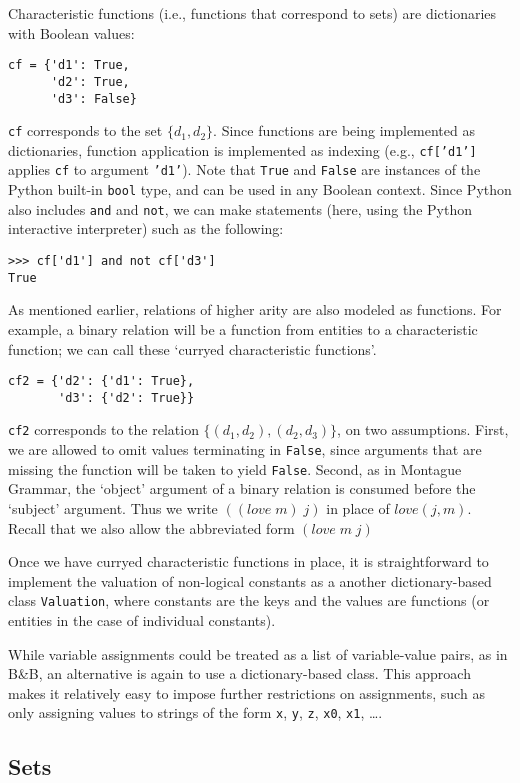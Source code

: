 \documentclass[11pt]{article}
\newcommand{\code}[1]{\texttt{#1}}
\newcommand{\bnb}{B\&B}
\begin{document}
Characteristic functions (i.e.,  functions that correspond to sets)
are dictionaries with Boolean values:
\begin{Verbatim}
cf = {'d1': True, 
      'd2': True, 
      'd3': False}
\end{Verbatim}
\code{cf} corresponds to the set $\{d_1, d_2\}$. Since functions are
being implemented as dictionaries, function application is implemented
as indexing (e.g., \code{cf['d1']} applies \code{cf} to argument
\code{'d1'}). Note that \code{True} and \code{False} are
instances of the Python built-in \code{bool} type, and can be used
in any Boolean context. Since Python also includes \code{and} and
\code{not}, we can make statements (here, using the Python interactive
interpreter) such as the following:
\begin{Verbatim}
>>> cf['d1'] and not cf['d3']
True
\end{Verbatim}
As mentioned earlier, relations of higher arity are also modeled as
functions. For example, a binary relation will be a function from
entities to a characteristic function; we can call these `curryed
characteristic functions'.
\begin{Verbatim}
cf2 = {'d2': {'d1': True},
       'd3': {'d2': True}}
\end{Verbatim}
\code{cf2} corresponds to the relation $\{(d_1, d_2), (d_2, d_3)\}$,
on two assumptions. First, we are allowed to omit values terminating
in \code{False}, since arguments that are missing the function will
be taken to yield \code{False}. Second, as in Montague Grammar, the
`object' argument of a binary relation is consumed before the
`subject' argument. Thus we write $((\mathit{love}\; m)\; j)$ in place
of $\mathit{love}(j, m)$. Recall that we also allow the abbreviated form
$(\mathit{love}\; m\; j)$

Once we have curryed characteristic functions in place, it is
straightforward to implement the valuation of non-logical constants as a
another dictionary-based class \code{Valuation}, where constants are
the keys and the values are functions (or entities in the case of
individual constants). 

While variable assignments could be treated as a list of
variable-value pairs, as in \bnb, an alternative
is again to use a dictionary-based class. This approach makes it
relatively easy to impose further restrictions on assignments, such as
only assigning values to strings of the form \code{x}, \code{y},
\code{z}, \code{x0}, \code{x1}, \ldots.


\subsection{Sets}
\end{document}
